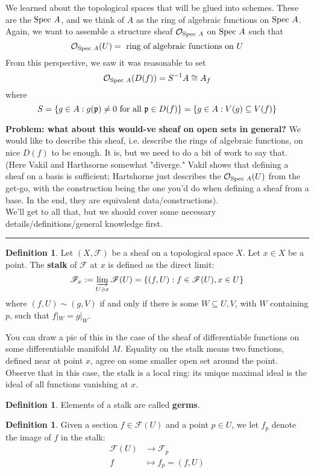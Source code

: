 \documentclass[10pt,reqno]{amsart}
\theoremstyle{definition}
\newtheorem{definition}[theorem]{Definition}
\theoremstyle{remark}
\numberwithin{equation}{section}
\numberwithin{theorem}{section}
\newcommand{\OO}{{\mathcal O}}
\newcommand{\spec}{\textup{Spec }}
\newcommand{\FF}{{\mathscr F}}
\newcommand{\pp}{\frak{p}}
\begin{document}
We learned about the topological spaces that will be glued into schemes. These are the $\spec A$, and we think of $A$ as the ring of algebraic functions on $\spec A$. Again, we want to assemble a structure sheaf $\OO_{\spec A}$ on $\spec A$ such that
\[\OO_{\spec A}(U) = \textup{ ring of algebraic functions on $U$}\]
From this perspective, we saw it was reasonable to set 
\[\OO_{\spec A}(D(f)) = S^{-1}A \cong A_f\]
where 
\[S = \{g \in A: g(\pp) \ne 0 \textup{ for all }\pp \in D(f)\} = \{g \in A: V(g) \subseteq V(f)\}\]

\textbf{Problem: what about this would-ve sheaf on open sets in general?} We would like to describe this sheaf, i.e. describe the rings of algebraic functions, on nice $D(f)$ to be enough. It is, but we need to do a bit of work to say that. (Here Vakil and Harthsorne somewhat "diverge." Vakil shows that defining a sheaf on a basis is sufficient; Hartshorne just describes the $\OO_{\spec A}(U)$ from the get-go, with the construction being the one you'd do when defining a sheaf from a base. In the end, they are equivalent data/constructions).
\\

We'll get to all that, but we should cover some necessary details/definitions/general knowledge first.
\\

\hrule
\vspace{1em} 

\begin{definition} Let $(X,\FF)$ be a sheaf on a topological space $X$. Let $x \in X$ be a point. The \textbf{stalk} of $\FF$ at $x$ is defined as the direct limit:
\[\FF_x := \varinjlim_{U \ni x} \FF(U) = \{(f,U) : f \in \FF(U), x \in U\}\]
where $(f,U) \sim (g,V)$ if and only if there is some $W \subseteq U,V$, with $W$ containing $p$, such that $f|_W = g|_W$.
\end{definition}

You can draw a pic of this in the case of the sheaf of differentiable functions on some differentiable manifold $M$. Equality on the stalk means two functions, defined near at point $x$, agree on some smaller open set around the point. Observe that in this case, the stalk is a local ring: its unique maximal ideal is the ideal of all functions vanishing at $x$.

\begin{definition} Elements of a stalk are called \textbf{germs}.
\end{definition}

\begin{definition} Given a section $f \in \FF(U)$ and a point $p \in U$, we let $f_p$ denote the image of $f$ in the stalk:
\begin{align*}
\FF(U) &\to \FF_p\\
 f &\mapsto f_p = (f, U)
\end{align*}
\end{definition}
\end{document}
